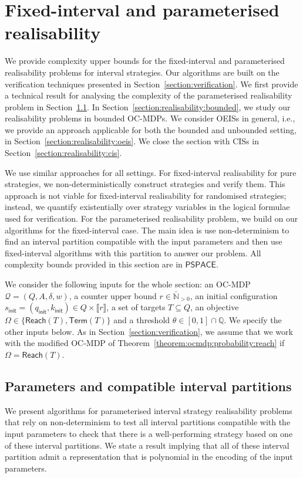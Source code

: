\documentclass[a4paper,UKenglish,cleveref,autoref,thm-restate,colorlinks]{lipics-v2021}
\newcommand{\init}{\mathsf{init}}
\newcommand{\integerInterval}[1]{\llbracket{}#1\rrbracket{}}
\newcommand{\ccInt}[2]{\left[#1, #2\right]}
\newcommand{\pspace}{\textsf{PSPACE}}
\newcommand{\IN}{\mathbb{N}}
\newcommand{\IQ}{\mathbb{Q}}
\newcommand{\INposBar}{\bar{\IN}_{>0}}
\newcommand{\weight}{w}
\newcommand{\ocmdp}{\mathcal{Q}}
\newcommand{\ocStateSpace}{Q}
\newcommand{\ocState}{q}
\newcommand{\ocCount}{k}
\newcommand{\ocConfig}{s}
\newcommand{\ocActionSpace}{A}
\newcommand{\ocTrans}{\delta}
\newcommand{\ocTuple}{(\ocStateSpace, \ocActionSpace, \ocTrans, \weight)}
\newcommand{\counterUB}{r}
\newcommand{\objective}{\Omega}
\newcommand{\reach}[1]{\mathsf{Reach}(#1)}
\newcommand{\target}{T}
\newcommand{\termination}{\mathsf{Term}}
\newcommand{\selectiveTermination}[1]{\termination({#1})}
\newcommand{\thresProba}{\theta}
\begin{document}
 
\section{Fixed-interval and parameterised realisability}\label{section:realisability}
We provide complexity upper bounds for the fixed-interval and parameterised realisability problems for interval strategies.
Our algorithms are built on the verification techniques presented in Section~\ref{section:verification}.
We first provide a technical result for analysing the complexity of the parameterised realisability problem in Section~\ref{section:realisability:technical}.
In Section~\ref{section:realisability:bounded}, we study our realisability problems in bounded OC-MDPs.
We consider OEISs in general, i.e., we provide an approach applicable for both the bounded and unbounded setting, in Section~\ref{section:realisability:oeis}.
We close the section with CISs in Section~\ref{section:realisability:cis}.

We use similar approaches for all settings.
For fixed-interval realisability for pure strategies, we non-deterministically construct strategies and verify them.
This approach is not viable for fixed-interval realisability for randomised strategies; instead, we quantify existentially over strategy variables in the logical formulae used for verification.
For the parameterised realisability problem, we build on our algorithms for the  fixed-interval case.
The main idea is use non-determinism to find an interval partition compatible with the input parameters and then use fixed-interval algorithms with this partition to answer our problem.
All complexity bounds provided in this section are in $\pspace$.

We consider the following inputs for the whole section: an OC-MDP $\ocmdp=\ocTuple$, a counter upper bound $\counterUB\in\INposBar$, an initial configuration $\ocConfig_\init=(\ocState_\init, \ocCount_\init)\in\ocStateSpace\times\integerInterval{\counterUB}$, a set of targets $\target\subseteq\ocStateSpace$, an objective $\objective\in\{\reach{\target}, \selectiveTermination{\target}\}$  and a threshold $\thresProba\in\ccInt{0}{1}\cap\IQ$.
We specify the other inputs below.
As in Section~\ref{section:verification}, we assume that we work with the modified OC-MDP of Theorem~\ref{theorem:ocmdp:probability:reach} if $\objective=\reach{\target}$.

\subsection{Parameters and compatible interval partitions}\label{section:realisability:technical}
We present algorithms for parameterised interval strategy realisability problems that rely on non-determinism to test all interval partitions compatible with the input parameters to check that there is a well-performing strategy based on one of these interval partitions.
We state a result implying that all of these interval partition admit a representation that is polynomial in the encoding of the input parameters.
\end{document}
